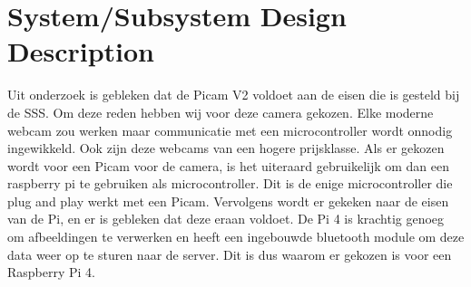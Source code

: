 \section{System/Subsystem Design Description}
Uit onderzoek is gebleken dat de Picam V2 voldoet aan de eisen die is gesteld bij de SSS. Om deze reden hebben wij voor deze camera gekozen. Elke moderne webcam zou werken maar communicatie met een microcontroller wordt onnodig ingewikkeld. Ook zijn deze webcams van een hogere prijsklasse.
Als er gekozen wordt voor een Picam voor de camera, is het uiteraard gebruikelijk om dan een raspberry pi te gebruiken als microcontroller. Dit is de enige microcontroller die plug and play werkt met een Picam. Vervolgens wordt er gekeken naar de eisen van de Pi, en er is gebleken dat deze eraan voldoet. De Pi 4 is krachtig genoeg om afbeeldingen te verwerken en heeft een ingebouwde bluetooth module om deze data weer op te sturen naar de server. Dit is dus waarom er gekozen is voor een Raspberry Pi 4.